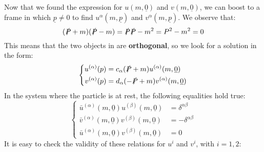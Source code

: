 \documentclass[../main.tex]{subfiles}
\begin{document}
Now that we found the expression for $u(m,\underline{0})$ and $v(m,\underline{0})$, we can boost to a frame in which $\underline{p}\neq0$ to find $u^\alpha(m,\underline{p})$ and $v^\alpha(m,\underline{p})$. We observe that: 
\[
(\slashed{P}+m)(\slashed{P}-m)=\slashed{P}\slashed{P}-m^2=P^2-m^2=0
\]
This means that the two objects in  are \textbf{orthogonal}, so we look for a solution in the form:
\[
\left\{
\begin{aligned}
u^{(\alpha)}(p)&=c_\alpha(\slashed{P}+m)u^{(\alpha)}(m,\underline{0})\\
v^{(\alpha)}(p)&=d_\alpha(-\slashed{P}+m)v^{(\alpha)}(m,\underline{0})
\end{aligned}
\right.
\]
In the system where the particle is at rest, the following equalities hold true:
\[
\left\{
\begin{aligned}
\bar{u}^{(\alpha)}(m,\underline{0})u^{(\beta)}(m,\underline{0})&=\delta^{\alpha\beta}\\
\bar{v}^{(\alpha)}(m,\underline{0})v^{(\beta)}(m,\underline{0})&=-\delta^{\alpha\beta}\\
\bar{u}^{(\alpha)}(m,\underline{0})v^{(\beta)}(m,\underline{0})&=0
\end{aligned}
\right.
\]
It is easy to check the validity of these relations for $u^i$ and $v^i$, with $i=1,2$:
\end{document}
